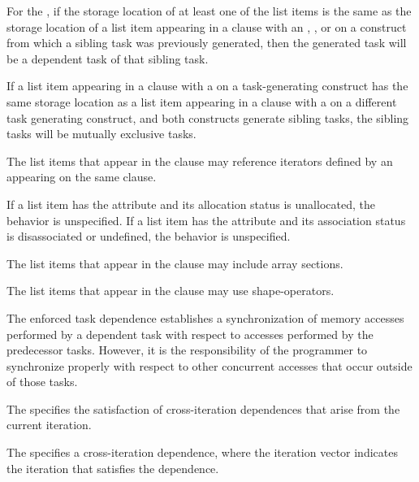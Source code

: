 For the  , if the storage location of at least one
of the list items is the same as the storage location of a list item appearing
in a  clause with an , , or   on
a construct from which a sibling task was previously generated, then the
generated task will be a dependent task of that sibling task.

If a list item appearing in a  clause with a 
 on a task-generating construct has the same storage location as
a list item appearing in a  clause with a 
 on a different task generating construct, and both constructs
generate sibling tasks, the sibling tasks will be mutually exclusive tasks.

The list items that appear in the  clause may reference iterators
defined by an  appearing on the same clause.

\begin{fortranspecific}
If a list item has the  attribute and its allocation
status is unallocated, the behavior is unspecified. If a list item has
the  attribute and its association status is
disassociated or undefined, the behavior is unspecified.
\end{fortranspecific}

The list items that appear in the  clause may include array sections.

\begin{ccppspecific}
The list items that appear in the  clause may use shape-operators.
\end{ccppspecific}

\begin{note}
The enforced task dependence establishes a synchronization of memory
accesses performed by a dependent task with respect to accesses performed by the
predecessor tasks. However, it is the responsibility of the programmer to synchronize properly with respect to other concurrent accesses that occur outside of those tasks.
\end{note}

The   specifies the satisfaction of
cross-iteration dependences that arise from the current iteration.

The   specifies a cross-iteration dependence,
where the iteration vector  indicates the iteration that satisfies
the dependence.

